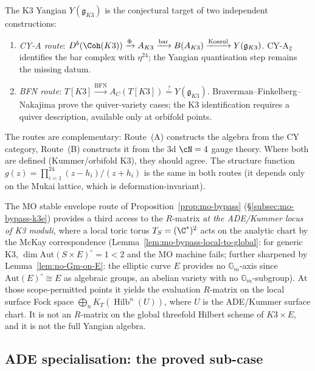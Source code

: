 \begin{remark}
\label{rem:k3e-two-routes-yangian}
The K3 Yangian $Y(\mathfrak{g}_{K3})$ is the conjectural target of two independent constructions:
\begin{enumerate}[label=\textup{(\Alph*)}]
 \item \emph{CY-A route}: $D^b(\Coh(K3)) \xrightarrow{\Phi} A_{K3} \xrightarrow{\text{bar}} B(A_{K3}) \xrightarrow{\text{Koszul}} Y(\mathfrak{g}_{K3})$. CY-A$_2$ identifies the bar complex with $\eta^{24}$; the Yangian quantisation step remains the missing datum.
 \item \emph{BFN route}: $T[K3] \xrightarrow{\text{BFN}} A_C(T[K3]) \stackrel{?}{=} Y(\mathfrak{g}_{K3})$. Braverman--Finkelberg--Nakajima prove the quiver-variety cases; the K3 identification requires a quiver description, available only at orbifold points.
\end{enumerate}
The routes are complementary: Route~(A) constructs the algebra from the CY category, Route~(B) constructs it from the 3d $\cN = 4$ gauge theory. Where both are defined (Kummer/orbifold K3), they should agree. The structure function $g(z) = \prod_{i=1}^{24} (z - h_i)/(z + h_i)$ is the same in both routes (it depends only on the Mukai lattice, which is deformation-invariant).

The MO stable envelope route of Proposition~\ref{prop:mo-bypass} (\S\ref{subsec:mo-bypass-k3e}) provides a third access to the $R$-matrix \emph{at the ADE/Kummer locus of K3 moduli}, where a local toric torus $T_S = (\C^*)^2$ acts on the analytic chart by the McKay correspondence (Lemma~\ref{lem:mo-bypass-local-to-global}: for generic K3, $\dim \mathrm{Aut}(S \times E)^\circ = 1 < 2$ and the MO machine fails; further sharpened by Lemma~\ref{lem:no-Gm-on-E}: the elliptic curve $E$ provides no $\mathbb{G}_m$-axis since $\mathrm{Aut}(E)^\circ \cong E$ as algebraic groups, an abelian variety with no $\mathbb{G}_m$-subgroup). At those scope-permitted points it yields the evaluation $R$-matrix on the local surface Fock space \(\bigoplus_n K_T(\operatorname{Hilb}^n(U))\), where \(U\) is the ADE/Kummer surface chart. It is not an $R$-matrix on the global threefold Hilbert scheme of \(K3\times E\), and it is not the full Yangian algebra.
\end{remark}

\subsection{ADE specialisation: the proved sub-case}
\label{subsec:k3e-bfn-ade-proved}

